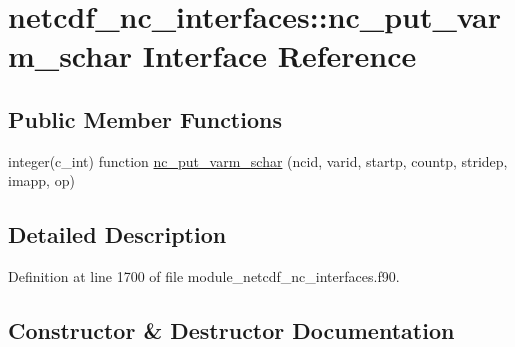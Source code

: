 \hypertarget{interfacenetcdf__nc__interfaces_1_1nc__put__varm__schar}{}\section{netcdf\+\_\+nc\+\_\+interfaces\+:\+:nc\+\_\+put\+\_\+varm\+\_\+schar Interface Reference}
\label{interfacenetcdf__nc__interfaces_1_1nc__put__varm__schar}
\subsection*{Public Member Functions}
\begin{DoxyCompactItemize}
\item 
integer(c\+\_\+int) function \hyperlink{interfacenetcdf__nc__interfaces_1_1nc__put__varm__schar_add896f02dd49a4c3a901ac93b4522387}{nc\+\_\+put\+\_\+varm\+\_\+schar} (ncid, varid, startp, countp, stridep, imapp, op)
\end{DoxyCompactItemize}


\subsection{Detailed Description}


Definition at line 1700 of file module\+\_\+netcdf\+\_\+nc\+\_\+interfaces.\+f90.



\subsection{Constructor \& Destructor Documentation}
\mbox{\label{interfacenetcdf__nc__interfaces_1_1nc__put__varm__schar_add896f02dd49a4c3a901ac93b4522387}} 
